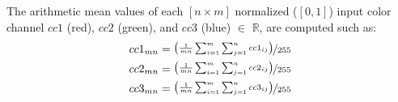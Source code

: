 \documentclass[superscriptaddress,longbibliography,aps,prl,twocolumn,10pt]{revtex4-2}
\begin{document}
\noindent
The arithmetic mean values of each $[n \times m]$ normalized ($[0,1]$) input color channel $cc1$ (red), $cc2$ (green), and $cc3$ (blue) $\in$ $\mathbb{R}$, are computed such as:
    \begin{equation} \label{eq:meanvalues}
    \begin{aligned}
        &cc1_{mn} = \nicefrac{\left( \frac{1}{mn} \sum_{i=1}^{m} \sum_{j=1}^{n} cc1_{ij} \right)}{255} \\ 
        &cc2_{mn} = \nicefrac{\left( \frac{1}{mn} \sum_{i=1}^{m} \sum_{j=1}^{n} cc2_{ij} \right)}{255} \\
        &cc3_{mn} = \nicefrac{\left( \frac{1}{mn} \sum_{i=1}^{m} \sum_{j=1}^{n} cc3_{ij} \right)}{255}
    \end{aligned}
    \end{equation}
\end{document}
